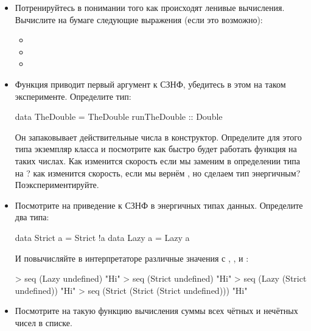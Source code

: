 \begin{itemize}

\item Потренируйтесь в понимании того как происходят
        ленивые вычисления. Вычислите на бумаге 
        следующие выражения (если это возможно):

\begin{itemize}
\item 
{}

\item {}
\item {}
\end{itemize}

\item Функция  приводит первый аргумент к СЗНФ,
    убедитесь в этом на таком эксперименте. Определите
    тип:

\begin{code}
data TheDouble = TheDouble { runTheDouble :: Double }
\end{code} 

Он запаковывает действительные числа в конструктор. 
Определите для этого типа экземпляр класса  
и посмотрите как быстро будет работать функция 
на таких числах. Как изменится скорость если мы заменим
в определении типа  на ? 
как изменится скорость, если мы вернём , но
сделаем тип  энергичным? Поэкспериментируйте.

\item Посмотрите на приведение к СЗНФ в энергичных типах данных.
Определите два типа:

\begin{code}
data Strict a = Strict !a
data Lazy   a = Lazy    a
\end{code} 

И повычисляйте в интерпретаторе различные значения с ,
, \In{($!)} и :

\begin{code}
> seq (Lazy undefined) "Hi"
> seq (Strict undefined) "Hi"
> seq (Lazy (Strict undefined)) "Hi"
> seq (Strict (Strict (Strict undefined))) "Hi"
\end{code} 

\item Посмотрите на такую функцию вычисления суммы
        всех чётных и нечётных чисел в списке. 


\end{itemize}
